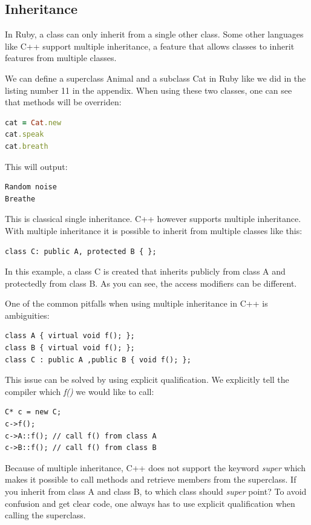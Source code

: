 \documentclass[10pt,a4paper,twocolumn]{article}
\begin{document}
\subsection{Inheritance}
In Ruby, a class can only inherit from a single other class. Some other languages like C++ support multiple inheritance, a feature that allows classes to inherit features from multiple classes.

We can define a superclass Animal and a subclass Cat in Ruby like we did in the listing number 11 in the appendix. When using these two classes, one can see that methods will be overriden:

\begin{lstlisting}[language=Ruby]
cat = Cat.new
cat.speak
cat.breath
\end{lstlisting}

This will output:

\begin{lstlisting}
Random noise
Breathe
\end{lstlisting}

This is classical single inheritance. C++ however supports multiple inheritance. With multiple inheritance it is possible to inherit from multiple classes like this:

\begin{lstlisting}
class C: public A, protected B { };
\end{lstlisting}

In this example, a class C is created that inherits publicly from class A and protectedly from class B. As you can see, the access modifiers can be different. 

One of the common pitfalls when using multiple inheritance in C++ is ambiguities:

\begin{lstlisting}
class A { virtual void f(); };
class B { virtual void f(); };
class C : public A ,public B { void f(); };
\end{lstlisting}

This issue can be solved by using explicit qualification. We explicitly tell the compiler which \textit{f()} we would like to call:

\begin{lstlisting}
C* c = new C;
c->f();
c->A::f(); // call f() from class A
c->B::f(); // call f() from class B
\end{lstlisting}

Because of multiple inheritance, C++ does not support the keyword \textit{super} which makes it possible to call methods and retrieve members from the superclass. If you inherit from class A and class B, to which class should \textit{super} point? To avoid confusion and get clear code, one always has to use explicit qualification when calling the superclass.
\end{document}

